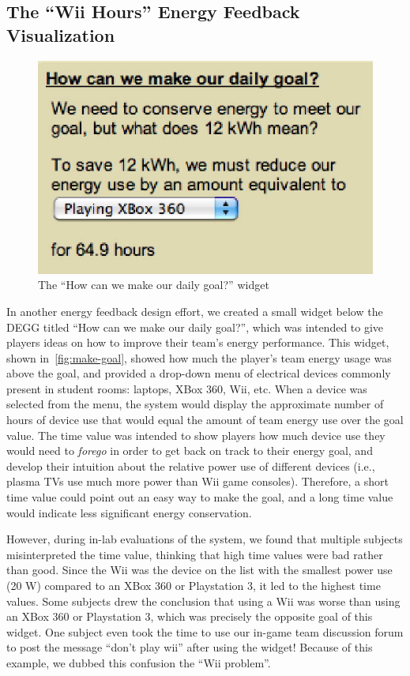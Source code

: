 \documentclass[10pt, conference, compsocconf]{IEEEtran-old}
\begin{document}
\subsection{The ``Wii Hours'' Energy Feedback Visualization}

\begin{figure}[!tb]
	\centering
	\includegraphics[width=0.9\columnwidth]{how-meet-goal.eps}
	\caption{The ``How can we make our daily goal?'' widget}
	\label{fig:make-goal}
\end{figure}

In another energy feedback design effort, we created a small widget below the DEGG titled ``How can we make our daily goal?'', which was intended to give players ideas on how to improve their team's energy performance. This widget, shown in~\autoref{fig:make-goal}, showed how much the player's team energy usage was above the goal, and provided a drop-down menu of electrical devices commonly present in student rooms: laptops, XBox 360, Wii, etc. When a device was selected from the menu, the system would display the approximate number of hours of device use that would equal the amount of team energy use over the goal value. The time value was intended to show players how much device use they would need to \emph{forego} in order to get back on track to their energy goal, and develop their intuition about the relative power use of different devices (i.e., plasma TVs use much more power than Wii game consoles). Therefore, a short time value could point out an easy way to make the goal, and a long time value would indicate less significant energy conservation.

However, during in-lab evaluations of the system, we found that multiple subjects misinterpreted the time value, thinking that high time values were bad rather than good. Since the Wii was the device on the list with the smallest power use (20 W) compared to an XBox 360 or Playstation 3, it led to the highest time values. Some subjects drew the conclusion that using a Wii was worse than using an XBox 360 or Playstation 3, which was precisely the opposite goal of this widget. One subject even took the time to use our in-game team discussion forum to post the message ``don't play wii'' after using the widget! Because of this example, we dubbed this confusion the ``Wii problem''.
\end{document}

